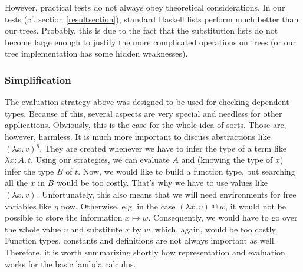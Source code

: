 \documentclass[12pt, a4paper, titlepage]{article}
\makeatletter
\newcommand{\sspace}{\,}
\newcommand{\la}{\lambda}
\newcommand{\emphSec}[1]{#1}
\newcommand{\LaAT}[3]{\la {#1}:{#2}. \sspace #3}
\newcommand{\AbsO}[3]{\left( \la {#1}. \sspace {#2} \right)^{#3}}
\newcommand{\ap}{\,@\,}
\makeatother
\begin{document}
However, practical tests do not always obey theoretical considerations. In our tests (cf. section \ref{resultsection}), standard Haskell lists perform much better than our trees. Probably, this is due to the fact that the substitution lists do not become large enough to justify the more complicated operations on trees (or our tree implementation has some hidden weaknesses). 

\subsubsection{Simplification}\label{simplification}

The evaluation strategy above was designed to be used for checking dependent types. Because of this, several aspects are very special and needless for other applications. Obviously, this is the case for the whole idea of sorts. Those are, however, harmless. It is much more important to discuss \emphSec{abstractions} like $\AbsO{x}{v}{\eta}$. They are created whenever we have to infer the type of a term like $\LaAT x A t$. Using our strategies, we can evaluate $A$ and (knowing the type of $x$) infer the type $B$ of $t$. Now, we would like to build a \emphSec{function type}, but searching all the $x$ in $B$ would be too costly. That's why we have to use values like $\AbsO{x}{v}{ }$. Unfortunately, this also means that we will need environments for free variables like $\eta$ now. Otherwise, e.g. in the case $\AbsO{x}{v}{ } \ap w$, it would not be possible to store the information $x \mapsto w$. Consequently, we would have to go over the whole value $v$ and substitute $x$ by $w$, which, again, would be too costly. \emphSec{Function types}, \emphSec{constants} and \emphSec{definitions} are not always important as well.\\
Therefore, it is worth summarizing shortly how representation and evaluation works for the basic lambda calculus.
\end{document}
